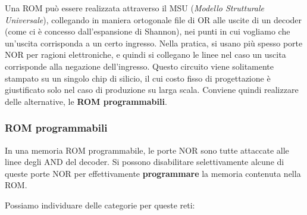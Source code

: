 \documentclass[a4paper,11pt]{article}
\begin{document}
Una ROM può essere realizzata attraverso il MSU (\textit{Modello Strutturale Universale}), collegando in maniera ortogonale file di OR alle uscite di un decoder (come ci è concesso dall'espansione di Shannon), nei punti in cui vogliamo che un'uscita corrisponda a un certo ingresso.
Nella pratica, si usano più spesso porte NOR per ragioni elettroniche, e quindi si collegano le linee nel caso un uscita corrisponde alla negazione dell'ingresso.
Questo circuito viene solitamente stampato su un singolo chip di silicio, il cui costo fisso di progettazione è giustificato solo nel caso di produzione su larga scala.
Conviene quindi realizzare delle alternative, le \textbf{ROM programmabili}.

\subsubsection{ROM programmabili}
In una memoria ROM programmabile, le porte NOR sono tutte attaccate alle linee degli AND del decoder.
Si possono disabilitare selettivamente alcune di queste porte NOR per effettivamente \textbf{programmare} la memoria contenuta nella ROM.

Possiamo individuare delle categorie per queste reti:
\end{document}
